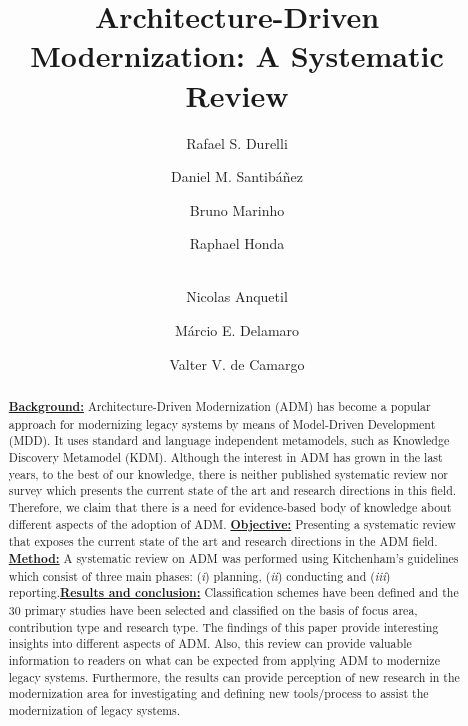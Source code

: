\documentclass{llncs}
\begin{document}
\title{Architecture-Driven Modernization: A Systematic Review}


\author{Rafael S. Durelli 
\and Daniel M. Santib\'{a}\~{n}ez \and Bruno Marinho \and Raphael Honda\and\\
Nicolas Anquetil\and M\'{a}rcio E. Delamaro \and Valter V. de Camargo}



\maketitle

\begin{abstract}

\underline{\textbf{Background:}} Architecture-Driven Modernization (ADM) has become a popular approach for modernizing legacy systems by means of Model-Driven Development (MDD). It uses standard and language independent metamodels, such as Knowledge Discovery Metamodel (KDM). Although the interest in ADM has grown in the last years, to the best of our knowledge, there is neither published systematic review nor survey which presents the current state of the art and research directions in this field. Therefore, we claim that there is a need for evidence-based body of knowledge about different aspects of the adoption of ADM. \underline{\textbf{Objective:}} Presenting a systematic review that exposes the current state of the art and research directions in the ADM field. \underline{\textbf{Method:}} A systematic review on ADM was performed using Kitchenham's guidelines which consist of three main phases: (\textit{i}) planning, (\textit{ii}) conducting and (\textit{iii}) reporting.\underline{\textbf{Results and conclusion:}} Classification schemes have been defined and the 30 primary studies have been selected and classified on the basis of focus area, contribution type and research type. The findings of this paper provide interesting insights into different aspects of ADM. Also, this review can provide valuable information to readers on what can be expected from applying ADM to modernize legacy systems. Furthermore, the results can provide perception of new research in the modernization area for investigating and defining new tools/process to assist the modernization of legacy systems.

\end{abstract}
\end{document}
